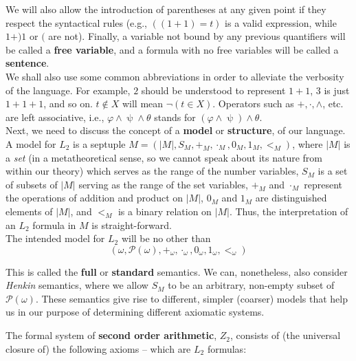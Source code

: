 \documentclass[../main.tex]{memoir}
\begin{document}
We will also allow the introduction of parentheses at any given point if they respect the syntactical rules (e.g., $((1 + 1) = t)$ is a valid expression, while $1 + ) 1$ or $($ are not). Finally, a variable not bound by any previous quantifiers will be called a \textbf{free variable}, and a formula with no free variables will be called a \textbf{sentence}. \\

We shall also use some common abbreviations in order to alleviate the verbosity of the language. For example, $2$ should be understood to represent $1 + 1$, $3$ is just $1 + 1 + 1$, and so on. $t \not\in X$ will mean $\neg(t \in X)$. Operators such as $+, \cdot, \land$, etc. are left associative, i.e., $\varphi \land \uppsi \land \theta$ stands for $(\varphi \land \uppsi) \land \theta$. \\

Next, we need to discuss the concept of a \textbf{model} or \textbf{structure}, of our language. A model for $L_2$ is a septuple $M = (|M|, S_M, +_M, \cdot_M, 0_M, 1_M, <_M)$, where $|M|$ is a \textit{set} (in a metatheoretical sense, so we cannot speak about its nature from within our theory) which serves as the range of the number variables, $S_M$ is a set of subsets of $|M|$ serving as the range of the set variables, $+_M$ and $\cdot_M$ represent the operations of addition and product on $|M|$, $0_M$ and $1_M$ are distinguished elements of $|M|$, and $<_M$ is a binary relation on $|M|$. Thus, the interpretation of an $L_2$ formula in $M$ is straight-forward. \\

The intended model for $L_2$ will be no other than
\[
  (\omega, \mathcal{P}(\omega), +_{\omega}, \cdot_{\omega}, 0_{\omega}, 1_{\omega}, <_{\omega})
\]

This is called the \textbf{full} or \textbf{standard} semantics. We can, nonetheless, also consider \textit{Henkin} semantics, where we allow $S_M$ to be an arbitrary, non-empty subset of $\mathcal{P}(\omega)$. These semantics give rise to different, simpler (coarser) models that help us in our purpose of determining different axiomatic systems.

The formal system of \textbf{second order arithmetic}, $Z_2$, consists of (the universal closure of) the following axioms -- which are $L_2$ formulas:
\end{document}
